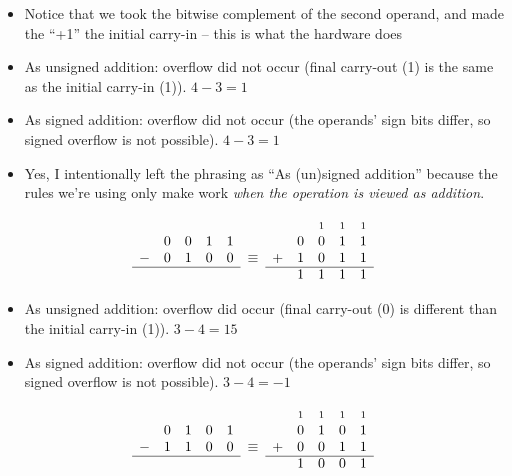 \documentclass{article}
\newcommand{\carry}{\scriptstyle 1}
\begin{document}
\begin{itemize}
\item Notice that we took the bitwise complement of the second operand, and made
    the ``+1'' the initial carry-in -- this is what the hardware does
\item As unsigned addition: overflow did not occur (final carry-out (1) is the
    same as the initial carry-in (1)). $4-3=1$
\item As signed addition: overflow did not occur (the operands' sign bits
    differ, so signed overflow is not possible). $4-3=1$
\item Yes, I intentionally left the phrasing as ``As (un)signed addition''
    because the rules we're using only make work \textit{when the operation is
    viewed as addition}.
\end{itemize}

\begin{equation*}\begin{array}{ccccccccccc}
  &   &   &   &   &        &   &   & \carry & \carry & \carry \\
  & 0 & 0 & 1 & 1 &        &   & 0 & 0 & 1 & 1 \\
- & 0 & 1 & 0 & 0 & \equiv & + & 1 & 0 & 1 & 1 \\ \cline{1-5}\cline{7-11}
  &   &   &   &   &        &   & 1 & 1 & 1 & 1
\end{array}\end{equation*}

\begin{itemize}
\item As unsigned addition: overflow did occur (final carry-out (0) is
    different than the initial carry-in (1)). $3-4=15$
\item As signed addition: overflow did not occur (the operands' sign bits
    differ, so signed overflow is not possible). $3-4=-1$
\end{itemize}

\begin{equation*}\begin{array}{ccccccccccc}
  &   &   &   &   &        &   & \carry & \carry & \carry & \carry \\
  & 0 & 1 & 0 & 1 &        &   & 0 & 1 & 0 & 1 \\
- & 1 & 1 & 0 & 0 & \equiv & + & 0 & 0 & 1 & 1 \\ \cline{1-5}\cline{7-11}
  &   &   &   &   &        &   & 1 & 0 & 0 & 1
\end{array}\end{equation*}
\end{document}
